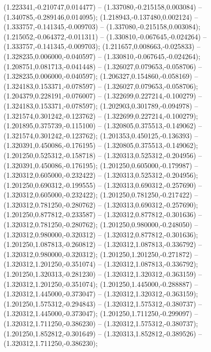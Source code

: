  (1.223341,-0.210747,0.014477) -- (1.337080,-0.215158,0.003084) -- (1.340785,-0.289146,0.014095);
 (1.218943,-0.137480,0.002124) -- (1.333757,-0.141345,-0.009703) -- (1.337080,-0.215158,0.003084);
 (1.215052,-0.064372,-0.011311) -- (1.330810,-0.067645,-0.024264) -- (1.333757,-0.141345,-0.009703);
 (1.211657,0.008663,-0.025833) -- (1.328235,0.006000,-0.040597) -- (1.330810,-0.067645,-0.024264);
 (1.208751,0.081713,-0.041448) -- (1.326027,0.079653,-0.058706) -- (1.328235,0.006000,-0.040597);
 (1.206327,0.154860,-0.058169) -- (1.324183,0.153371,-0.078597) -- (1.326027,0.079653,-0.058706);
 (1.204379,0.228191,-0.076007) -- (1.322699,0.227214,-0.100279) -- (1.324183,0.153371,-0.078597);
 (1.202903,0.301789,-0.094978) -- (1.321574,0.301242,-0.123762) -- (1.322699,0.227214,-0.100279);
 (1.201895,0.375739,-0.115100) -- (1.320805,0.375513,-0.149062) -- (1.321574,0.301242,-0.123762);
 (1.201353,0.450125,-0.136393) -- (1.320391,0.450086,-0.176195) -- (1.320805,0.375513,-0.149062);
 (1.201250,0.525312,-0.158718) -- (1.320313,0.525312,-0.204956) -- (1.320391,0.450086,-0.176195);
 (1.201250,0.605000,-0.179987) -- (1.320312,0.605000,-0.232422) -- (1.320313,0.525312,-0.204956);
 (1.201250,0.690312,-0.199555) -- (1.320313,0.690312,-0.257690) -- (1.320312,0.605000,-0.232422);
 (1.201250,0.781250,-0.217422) -- (1.320312,0.781250,-0.280762) -- (1.320313,0.690312,-0.257690);
 (1.201250,0.877812,-0.233587) -- (1.320312,0.877812,-0.301636) -- (1.320312,0.781250,-0.280762);
 (1.201250,0.980000,-0.248050) -- (1.320312,0.980000,-0.320312) -- (1.320312,0.877812,-0.301636);
 (1.201250,1.087813,-0.260812) -- (1.320312,1.087813,-0.336792) -- (1.320312,0.980000,-0.320312);
 (1.201250,1.201250,-0.271872) -- (1.320312,1.201250,-0.351074) -- (1.320312,1.087813,-0.336792);
 (1.201250,1.320313,-0.281230) -- (1.320312,1.320312,-0.363159) -- (1.320312,1.201250,-0.351074);
 (1.201250,1.445000,-0.288887) -- (1.320312,1.445000,-0.373047) -- (1.320312,1.320312,-0.363159);
 (1.201250,1.575312,-0.294843) -- (1.320312,1.575312,-0.380737) -- (1.320312,1.445000,-0.373047);
 (1.201250,1.711250,-0.299097) -- (1.320312,1.711250,-0.386230) -- (1.320312,1.575312,-0.380737);
 (1.201250,1.852812,-0.301649) -- (1.320313,1.852812,-0.389526) -- (1.320312,1.711250,-0.386230);
